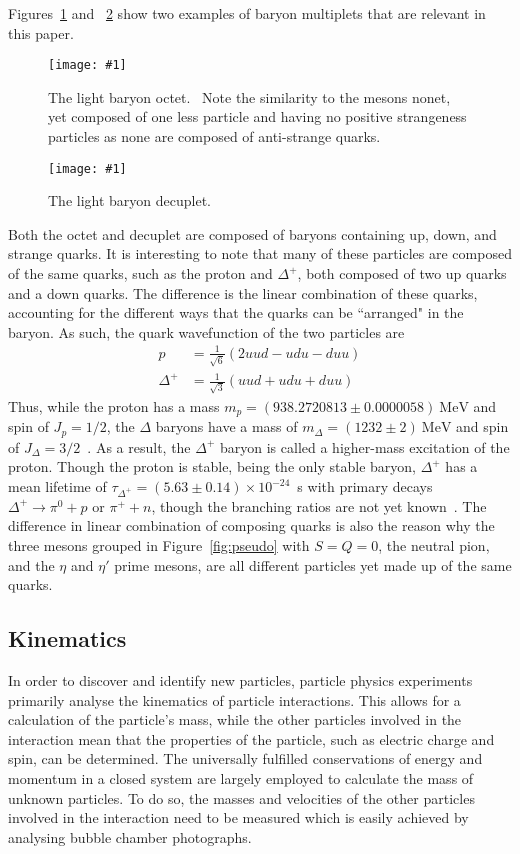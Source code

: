 \documentclass[twocolumn]{article}
\newcommand{\insertFigure}[1]{%
   \texttt{[image: \#1]}%
}
\begin{document}
\par Figures~\ref{fig:oct} and ~\ref{fig:dec} show two examples of baryon multiplets that are relevant in this paper.
\begin{figure}[!h]
	\centering
	\insertFigure{oct.png}
	\caption{The light baryon octet.~\cite{oct} Note the similarity to the mesons nonet, yet composed of one less particle and having no positive strangeness particles as none are composed of anti-strange quarks.}
	\label{fig:oct}
\end{figure}
\begin{figure}[!h]
	\centering
	\insertFigure{dec.png}
	\caption{The light baryon decuplet.~\cite{dec}}
	\label{fig:dec}
\end{figure}
Both the octet and decuplet are composed of baryons containing up, down, and strange quarks. It is interesting to note that many of these particles are composed of the same quarks, such as the proton and $\Delta^+$, both composed of two up quarks and a down quarks. The difference is the linear combination of these quarks, accounting for the different ways that the quarks can be ``arranged" in the baryon. As such, the quark wavefunction of the two particles are~\cite{Thompson}
\begin{align*}
p &= \frac {1}{\sqrt{6}} (2uud - udu - duu) \\
\Delta^+ &= \frac {1}{\sqrt{3}} (uud+udu+duu) 
\end{align*}
Thus, while the proton has a mass $m_p = (938.2720813 \pm 0.0000058)~\text{MeV}$ and spin of $J_p=1/2$, the $\Delta$ baryons have a mass of $m_\Delta = (1232 \pm 2)~\text{MeV}$ and spin of $J_\Delta=3/2$~\cite{pdg}. As a result, the $\Delta^+$ baryon is called a higher-mass excitation of the proton. Though the proton is stable, being the only stable baryon, $\Delta^+$ has a mean lifetime of $\tau_{\Delta^+}=(5.63 \pm 0.14) \times 10^{-24}$~s with primary decays $\Delta^+ \to \pi^0+p$ or $\pi^+ + n$, though the branching ratios are not yet known~\cite{pdg}. The difference in linear combination of composing quarks is also the reason why the three mesons grouped in Figure~\ref{fig:pseudo} with $S = Q = 0$, the neutral pion, and the $\eta$ and $\eta'$ prime mesons, are all different particles yet made up of the same quarks.

\subsection{Kinematics}
In order to discover and identify new particles, particle physics experiments primarily analyse the kinematics of particle interactions. This allows for a calculation of the particle's mass, while the other particles involved in the interaction mean that the properties of the particle, such as electric charge and spin, can be determined. The universally fulfilled conservations of energy and momentum in a closed system are largely employed to calculate the mass of unknown particles. To do so, the masses and velocities of the other particles involved in the interaction need to be measured which is easily achieved by analysing bubble chamber photographs.
\end{document}
